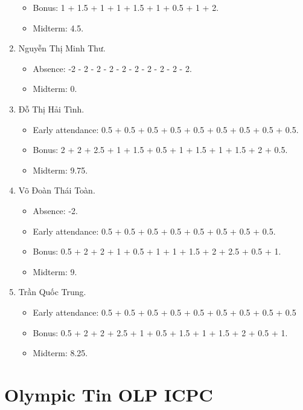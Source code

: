 \documentclass{article}
\begin{document}
\begin{enumerate}
\begin{itemize}
		\item Bonus: 1 + 1.5 + 1 + 1 + 1.5 + 1 + 0.5 + 1 + 2.
        \item Midterm: 4.5.
	\end{itemize}
	\item {\sc Nguyễn Thị Minh Thư.}
	\begin{itemize}
		\item Absence: -2 - 2 - 2 - 2 - 2 - 2 - 2 - 2 - 2 - 2.
        \item Midterm: 0.
	\end{itemize}
	\item {\sc Đỗ Thị Hải Tình.}
	\begin{itemize}
		\item Early attendance: 0.5 + 0.5 + 0.5 + 0.5 + 0.5 + 0.5 + 0.5 + 0.5 + 0.5.
		\item Bonus: 2 + 2 + 2.5 + 1 + 1.5 + 0.5 + 1 + 1.5 + 1 + 1.5 + 2 + 0.5.
        \item Midterm: 9.75.
	\end{itemize}
	\item {\sc Võ Đoàn Thái Toàn.}
	\begin{itemize}
		\item Absence: -2.
		\item Early attendance: 0.5 + 0.5 + 0.5 + 0.5 + 0.5 + 0.5 + 0.5 + 0.5.
		\item Bonus: 0.5 + 2 + 2 + 1 + 0.5 + 1 + 1 + 1.5 + 2 + 2.5 + 0.5 + 1.
        \item Midterm: 9.
	\end{itemize}
	\item {\sc Trần Quốc Trung.}
	\begin{itemize}
		\item Early attendance: 0.5 + 0.5 + 0.5 + 0.5 + 0.5 + 0.5 + 0.5 + 0.5 + 0.5
		\item Bonus: 0.5 + 2 + 2 + 2.5 + 1 + 0.5 + 1.5 + 1 + 1.5 + 2 + 0.5 + 1.
        \item Midterm: 8.25.
	\end{itemize}
\end{enumerate}


\section{Olympic Tin OLP ICPC}
\end{document}
